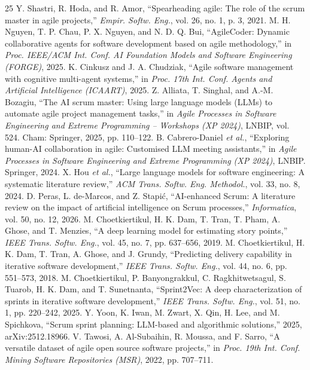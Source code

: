 \documentclass[conference]{IEEEtran}
\begin{document}
\begin{thebibliography}{25}
 Y. Shastri, R. Hoda, and R. Amor, ``Spearheading agile: The role of the scrum master in agile projects,'' \emph{Empir. Softw. Eng.}, vol. 26, no. 1, p. 3, 2021.
 M. H. Nguyen, T. P. Chau, P. X. Nguyen, and N. D. Q. Bui, ``AgileCoder: Dynamic collaborative agents for software development based on agile methodology,'' in \emph{Proc. IEEE/ACM Int. Conf. AI Foundation Models and Software Engineering (FORGE)}, 2025.
 K. Cinkusz and J. A. Chudziak, ``Agile software management with cognitive multi-agent systems,'' in \emph{Proc. 17th Int. Conf. Agents and Artificial Intelligence (ICAART)}, 2025.
 Z. Alliata, T. Singhal, and A.-M. Bozagiu, ``The AI scrum master: Using large language models (LLMs) to automate agile project management tasks,'' in \emph{Agile Processes in Software Engineering and Extreme Programming -- Workshops (XP 2024)}, LNBIP, vol. 524. Cham: Springer, 2025, pp. 110--122.
 B. Cabrero-Daniel \emph{et al.}, ``Exploring human-AI collaboration in agile: Customised LLM meeting assistants,'' in \emph{Agile Processes in Software Engineering and Extreme Programming (XP 2024)}, LNBIP. Springer, 2024.
 X. Hou \emph{et al.}, ``Large language models for software engineering: A systematic literature review,'' \emph{ACM Trans. Softw. Eng. Methodol.}, vol. 33, no. 8, 2024.
 D. Peras, L. de-Marcos, and Z. Stapi\'c, ``AI-enhanced Scrum: A literature review on the impact of artificial intelligence on Scrum processes,'' \emph{Informatica}, vol. 50, no. 12, 2026.
 M. Choetkiertikul, H. K. Dam, T. Tran, T. Pham, A. Ghose, and T. Menzies, ``A deep learning model for estimating story points,'' \emph{IEEE Trans. Softw. Eng.}, vol. 45, no. 7, pp. 637--656, 2019.
 M. Choetkiertikul, H. K. Dam, T. Tran, A. Ghose, and J. Grundy, ``Predicting delivery capability in iterative software development,'' \emph{IEEE Trans. Softw. Eng.}, vol. 44, no. 6, pp. 551--573, 2018.
 M. Choetkiertikul, P. Banyongrakkul, C. Ragkhitwetsagul, S. Tuarob, H. K. Dam, and T. Sunetnanta, ``Sprint2Vec: A deep characterization of sprints in iterative software development,'' \emph{IEEE Trans. Softw. Eng.}, vol. 51, no. 1, pp. 220--242, 2025.
 Y. Yoon, K. Iwan, M. Zwart, X. Qin, H. Lee, and M. Spichkova, ``Scrum sprint planning: LLM-based and algorithmic solutions,'' 2025, arXiv:2512.18966.
 V. Tawosi, A. Al-Subaihin, R. Moussa, and F. Sarro, ``A versatile dataset of agile open source software projects,'' in \emph{Proc. 19th Int. Conf. Mining Software Repositories (MSR)}, 2022, pp. 707--711.

\end{thebibliography}
\end{document}
